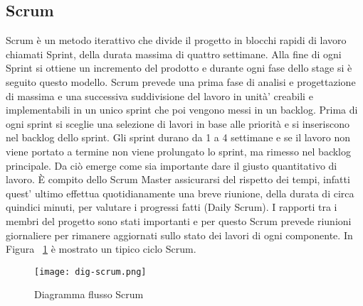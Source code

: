 \subsection{Scrum}
Scrum è un metodo iterattivo che divide il progetto in blocchi rapidi di lavoro chiamati
Sprint, della durata massima di quattro settimane. Alla fine di ogni Sprint si ottiene
un incremento del prodotto e durante ogni fase dello stage si è seguito questo modello. 
Scrum prevede una prima fase di analisi e progettazione di massima e una successiva suddivisione del lavoro in unità’ creabili e implementabili in un unico sprint che poi vengono messi in un backlog. Prima di ogni sprint si sceglie una selezione di lavori in base alle priorità e si inseriscono nel backlog dello sprint. Gli sprint durano da 1 a 4 settimane e se il lavoro non viene portato a termine non viene prolungato lo sprint, ma rimesso nel backlog principale. Da ciò emerge come sia importante dare il giusto quantitativo di lavoro. È compito dello
Scrum Master assicurarsi del rispetto dei tempi, infatti quest' ultimo effettua quotidianamente una breve
riunione, della durata di circa quindici minuti, per valutare i progressi fatti (Daily
Scrum). I rapporti tra i membri del progetto sono stati importanti e per questo Scrum prevede riunioni giornaliere per rimanere aggiornati sullo stato dei lavori di ogni componente.
In Figura ~\ref{fig:scrum} è mostrato un tipico ciclo Scrum.
\begin{figure}[!h]   
    \centering
    \texttt{[image: dig-scrum.png]} 
    \caption{Diagramma flusso Scrum}
    \label{fig:scrum} 
\end{figure}